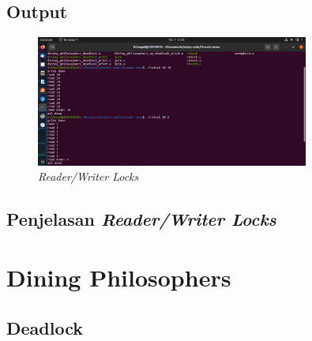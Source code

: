 \documentclass[11pt,a4paper]{article}
\begin{document}
\subsection{Output}
\begin{figure}[h]
	\centering
	\includegraphics[width=0.8\textwidth]{Figure1/rwlock.png}
	\caption{\textit{Reader/Writer Locks}}
\end{figure}

\subsection{Penjelasan \textit{Reader/Writer Locks}}

\section{Dining Philosophers}
\subsection{Deadlock}
\end{document}
